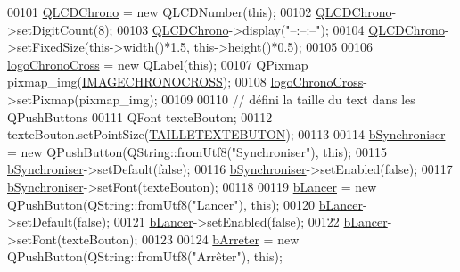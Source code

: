 \begin{DoxyCode}
00101     \hyperlink{class_i_h_m_chrono_cross_a6169c1483faab14d1f619d1d838c198e}{QLCDChrono} = \textcolor{keyword}{new} QLCDNumber(\textcolor{keyword}{this});
00102     \hyperlink{class_i_h_m_chrono_cross_a6169c1483faab14d1f619d1d838c198e}{QLCDChrono}->setDigitCount(8);
00103     \hyperlink{class_i_h_m_chrono_cross_a6169c1483faab14d1f619d1d838c198e}{QLCDChrono}->display(\textcolor{stringliteral}{"--:--:--"});
00104     \hyperlink{class_i_h_m_chrono_cross_a6169c1483faab14d1f619d1d838c198e}{QLCDChrono}->setFixedSize(this->width()*1.5, this->height()*0.5);
00105 
00106     \hyperlink{class_i_h_m_chrono_cross_a76f2f83c624da73e3d3de6a8b4ff43a1}{logoChronoCross}  = \textcolor{keyword}{new} QLabel(\textcolor{keyword}{this});
00107     QPixmap pixmap\_img(\hyperlink{ihmchronocross_8h_aa8bee638aa78f9b332485225ecc8e75e}{IMAGECHRONOCROSS});
00108     \hyperlink{class_i_h_m_chrono_cross_a76f2f83c624da73e3d3de6a8b4ff43a1}{logoChronoCross}->setPixmap(pixmap\_img);
00109 
00110     \textcolor{comment}{// défini la taille du text dans les QPushButtons}
00111     QFont texteBouton;
00112     texteBouton.setPointSize(\hyperlink{ihmchronocross_8h_a93c1a7628e080979c2ae8f83b6c69606}{TAILLETEXTEBUTON});
00113 
00114     \hyperlink{class_i_h_m_chrono_cross_aaef501bd1190a5ec06a214d3265b8c0b}{bSynchroniser} = \textcolor{keyword}{new} QPushButton(QString::fromUtf8(\textcolor{stringliteral}{"Synchroniser"}), \textcolor{keyword}{this});
00115     \hyperlink{class_i_h_m_chrono_cross_aaef501bd1190a5ec06a214d3265b8c0b}{bSynchroniser}->setDefault(\textcolor{keyword}{false});
00116     \hyperlink{class_i_h_m_chrono_cross_aaef501bd1190a5ec06a214d3265b8c0b}{bSynchroniser}->setEnabled(\textcolor{keyword}{false});
00117     \hyperlink{class_i_h_m_chrono_cross_aaef501bd1190a5ec06a214d3265b8c0b}{bSynchroniser}->setFont(texteBouton);
00118 
00119     \hyperlink{class_i_h_m_chrono_cross_a1b0a7c5e58d6a9f873cdc912d67b8de9}{bLancer} = \textcolor{keyword}{new}  QPushButton(QString::fromUtf8(\textcolor{stringliteral}{"Lancer"}), \textcolor{keyword}{this});
00120     \hyperlink{class_i_h_m_chrono_cross_a1b0a7c5e58d6a9f873cdc912d67b8de9}{bLancer}->setDefault(\textcolor{keyword}{false});
00121     \hyperlink{class_i_h_m_chrono_cross_a1b0a7c5e58d6a9f873cdc912d67b8de9}{bLancer}->setEnabled(\textcolor{keyword}{false});
00122     \hyperlink{class_i_h_m_chrono_cross_a1b0a7c5e58d6a9f873cdc912d67b8de9}{bLancer}->setFont(texteBouton);
00123 
00124     \hyperlink{class_i_h_m_chrono_cross_a75ce4fcdab11095834fe3f9e931f8964}{bArreter} = \textcolor{keyword}{new} QPushButton(QString::fromUtf8(\textcolor{stringliteral}{"Arrêter"}), \textcolor{keyword}{this});

\end{DoxyCode}
